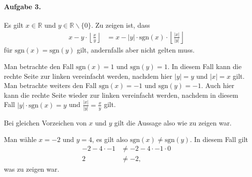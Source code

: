 \documentclass{article}
\begin{document}
\paragraph{Aufgabe 3.}

Es gilt $x \in \mathbb{R}$ und $y \in \mathbb{R} \backslash \{ 0 \}$. Zu zeigen ist, dass
\begin{align*}
    x - y \cdot \left\lfloor{\frac{x}{y}}\right\rfloor &= x - |y| \cdot \text{sgn}(x) \cdot \left\lfloor{\frac{|x|}{|y|}}\right\rfloor
\end{align*}
für $\text{sgn}(x) = \text{sgn}(y)$ gilt, andernfalls aber nicht gelten muss.

Man betrachte den Fall $\text{sgn}(x) = 1$ und $\text{sgn}(y) = 1$. In diesem Fall kann die rechte Seite zur linken vereinfacht werden, nachdem hier $|y| = y$ und $|x| = x$ gilt. Man betrachte weiters den Fall $\text{sgn}(x) = -1$ und $\text{sgn}(y) = -1$. Auch hier kann die rechte Seite wieder zur linken vereinfacht werden, nachdem in diesem Fall $|y| \cdot \text{sgn}(x) = y$ und $\frac{|x|}{|y|} = \frac{x}{y}$ gilt.

Bei gleichen Vorzeichen von $x$ und $y$ gilt die Aussage also wie zu zeigen war.

Man wähle $x = -2$ und $y = 4$, es gilt also $\text{sgn}(x) \neq \text{sgn}(y)$. In diesem Fall gilt
\begin{align*}
    -2 - 4 \cdot -1 &\neq -2 - 4 \cdot -1 \cdot 0 \\
    2 &\neq -2,
\end{align*}
was zu zeigen war.
\end{document}
